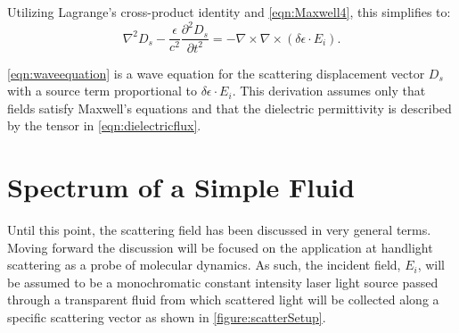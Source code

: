 Utilizing Lagrange’s cross-product identity and \eqn \ref{eqn:Maxwell4}, this simplifies to:
\begin{equation}
	\nabla^2D_s-\frac{\epsilon}{c^2}\frac{\partial^2 D_s}{\partial t^2}=-\nabla\times\nabla\times\left(\delta\epsilon\cdot E_i\right).
	\label{eqn:waveequation}
\end{equation}

\eqn\nolinebreak \ref{eqn:waveequation} is a wave equation for the scattering displacement vector $D_s$ with a source term proportional to $\delta\epsilon\cdot E_i$. This derivation assumes only that fields satisfy Maxwell’s equations and that the dielectric permittivity is described by the tensor in \eqn\nolinebreak \ref{eqn:dielectricflux}.  
 
 \section{Spectrum of a Simple Fluid} \label{sec:SpectrumOfSimpleFluid}
 Until this point, the scattering field has been discussed in very general terms.  Moving forward the discussion will be focused on the application at hand\textemdash light scattering as a probe of molecular dynamics.  As such, the incident field, $E_i$, will be assumed to be a monochromatic constant intensity laser light source passed through a transparent fluid from which scattered light will be collected along a specific scattering vector as shown in \fig \nolinebreak \ref{figure:scatterSetup}.
